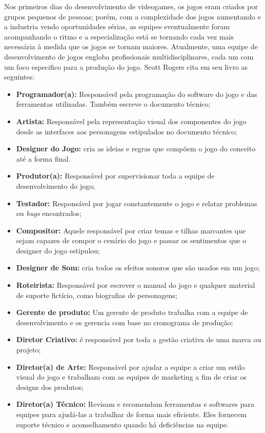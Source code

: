 Nos primeiros dias do desenvolvimento de videogames, os jogos eram criados por grupos pequenos de pessoas; porém, com a complexidade dos jogos aumentando e a industria vendo oportunidades sérias, as equipes eventualmente foram acompanhando o ritmo e a especialização está se tornando cada vez mais necessária à medida que os jogos se tornam maiores. Atualmente, uma equipe de desenvolvimento de jogos engloba profissionais multidisciplinares, cada um com um foco especifico para a produção do jogo. Scott Rogers cita em seu livro \cite{GameDesign} as seguintes: 
\begin{itemize}
    \item \textbf{Programador(a):} Responsável pela programação do software do jogo e das ferramentas utilizadas. Também escreve o documento técnico;
    \item \textbf{Artista:} Responsável pela representação visual dos componentes do jogo desde as interfaces aos personagens estipulados no documento técnico;
    \item \textbf{Designer do Jogo:} cria as ideias e regras que compõem o jogo do conceito até a forma final.
    \item \textbf{Produtor(a): }Responsável por supervisionar toda a equipe de desenvolvimento do jogo;
    \item \textbf{Testador:} Responsável por jogar constantemente o jogo e relatar problemas ou \textit{bugs} encontrados;
    \item \textbf{Compositor:} Aquele responsável por criar temas e tilhas marcantes que sejam capazes de compor o cenário do jogo e passar os sentimentos que o designer do jogo estipulou;
    \item \textbf{Designer de Som:} cria todos os efeitos sonoros que são usados em um jogo;
    \item \textbf{Roteirista:}  Responsável por escrever o manual do jogo e qualquer material de suporte fictício, como  biografias de personagens;
    \item \textbf{Gerente de produto:} Um gerente de produto trabalha com a equipe de desenvolvimento e os gerencia com base no cronograma de produção;
    \item \textbf{Diretor Criativo:} é responsável por toda a gestão criativa de uma marca ou projeto;
    \item \textbf{Diretor(a) de Arte:} Responsável por ajudar a equipe a criar um estilo visual do jogo e trabalham com as equipes de marketing a fim de criar os designs dos produtos;
    \item \textbf{Diretor(a) Técnico:} Revisam e recomendam ferramentas e softwares para equipes para ajudá-las a trabalhar de forma mais eficiente. Eles fornecem suporte técnico e aconselhamento quando há deficiências na equipe.
\end{itemize}

